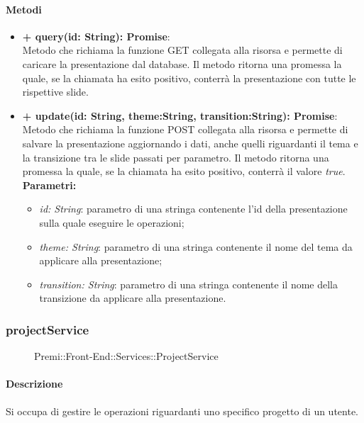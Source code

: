 	\paragraph{Metodi}
	\begin{itemize}
		\item \textbf{+ query(id: String): Promise}:\\
			Metodo che richiama la funzione GET collegata alla risorsa e permette di caricare la presentazione dal database. Il metodo ritorna una promessa la quale, se la chiamata ha esito positivo, conterrà la presentazione con tutte le rispettive slide.\\
		\item \textbf{+ update(id: String, theme:String, transition:String): Promise}:\\
			Metodo che richiama la funzione POST collegata alla risorsa e permette di salvare la presentazione aggiornando i dati, anche quelli riguardanti il tema e la transizione tra le slide passati per parametro. Il metodo ritorna una promessa la quale, se la chiamata ha esito positivo, conterrà il valore \textit{true}.\\
		\textbf{Parametri:}\\
		\begin{itemize}
			\item \textit{id: String}: parametro di una stringa contenente l'id della presentazione sulla quale eseguire le operazioni;
			\item \textit{theme: String}: parametro di una stringa contenente il nome del tema da applicare alla presentazione;
			\item \textit{transition: String}: parametro di una stringa contenente il nome della transizione da applicare alla presentazione.
		\end{itemize}
	\end{itemize}
	
	
\subsubsection{projectService}
	\begin{figure}[h]
		\centering
		\caption[Premi::Front-End::Services::ProjectService]{Premi::Front-End::Services::ProjectService}
	\end{figure}
	
	\paragraph{Descrizione}
	Si occupa di gestire le operazioni riguardanti uno specifico progetto di un utente.
	
